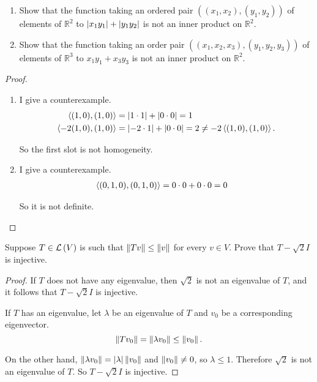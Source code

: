 \begin{exercise}
    \begin{enumerate}[label={(\alph*)}]
        \item Show that the function taking an ordered pair $\left((x_{1}, x_{2}), (y_{1}, y_{2})\right)$ of elements of $\mathbb{R}^{2}$ to $\left\vert{x_{1}y_{1}}\right\vert + \left\vert{y_{1}y_{2}}\right\vert$ is not an inner product on $\mathbb{R}^{2}$.
        \item Show that the function taking an order pair $\left((x_{1}, x_{2}, x_{3}), (y_{1}, y_{2}, y_{3})\right)$ of elements of $\mathbb{R}^{3}$ to $x_{1}y_{1} + x_{3}y_{3}$ is not an inner product on $\mathbb{R}^{2}$.
    \end{enumerate}
\end{exercise}

\begin{proof}
    \begin{enumerate}[label={(\alph*)}]
        \item I give a counterexample.
              \begin{align*}
                  \left\langle{(1, 0), (1, 0)}\right\rangle   & = \left\vert{1\cdot 1}\right\vert + \left\vert{0\cdot 0}\right\vert = 1                                    \\
                  \left\langle{-2(1, 0), (1, 0)}\right\rangle & = \left\vert{-2\cdot 1}\right\vert + \left\vert{0\cdot 0}\right\vert = 2 \ne -2\left\langle{(1, 0), (1, 0)}\right\rangle.
              \end{align*}

              So the first slot is not homogeneity.
        \item I give a counterexample.
              \begin{align*}
                  \left\langle{(0, 1, 0), (0, 1, 0)}\right\rangle & = 0\cdot 0 + 0\cdot 0 = 0
              \end{align*}

              So it is not definite.
    \end{enumerate}
\end{proof}
\newpage

\begin{exercise}
    Suppose $T\in\mathcal{L}\left({V}\right)$ is such that $\left\Vert{Tv}\right\Vert\leq \left\Vert{v}\right\Vert$ for every $v\in V$. Prove that $T - \sqrt{2}I$ is injective.
\end{exercise}

\begin{proof}
    If $T$ does not have any eigenvalue, then $\sqrt{2}$ is not an eigenvalue of $T$, and it follows that $T - \sqrt{2}I$ is injective.

    If $T$ has an eigenvalue, let $\lambda$ be an eigenvalue of $T$ and $v_{0}$ be a corresponding eigenvector.
    \[
        \left\Vert{Tv_{0}}\right\Vert = \left\Vert{\lambda v_{0}}\right\Vert\leq \left\Vert{v_{0}}\right\Vert.
    \]

    On the other hand, $\left\Vert{\lambda v_{0}}\right\Vert = \left\vert{\lambda}\right\vert\left\Vert{v_{0}}\right\Vert$ and $\left\Vert{v_{0}}\right\Vert \ne 0$, so $\lambda \leq 1$. Therefore $\sqrt{2}$ is not an eigenvalue of $T$. So $T - \sqrt{2}I$ is injective.
\end{proof}
\newpage

